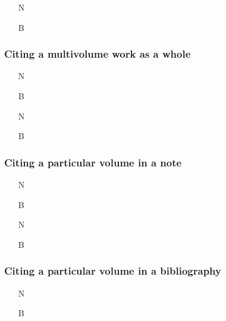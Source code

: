 \documentclass[11pt,letterpaper,oneside]{article}
\begin{document}
\begin{itemize}
\item[N] 

\item[B] 
\end{itemize}

\setcounter{subsubsection}{121}
\subsubsection{Citing a multivolume work as a whole}
\label{14.122}

\begin{itemize}
\item[N] 

\item[B] 

\item[N] 

\item[B] 
\end{itemize}

\subsubsection{Citing a particular volume in a note}
\label{14.123}

\begin{itemize}
\item[N] 

\item[B] 

\item[N] 

\item[B] 
\end{itemize}

\subsubsection{Citing a particular volume in a bibliography}
\label{14.124}

\begin{itemize}
\item[N] 

\item[B] 
\end{itemize}
\end{document}
